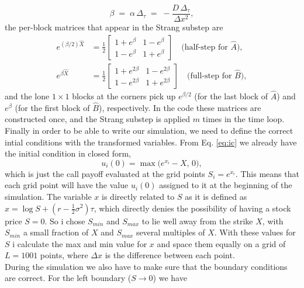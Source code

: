 \documentclass[11pt]{article}
\begin{document}
\begin{equation}
    \beta \;=\; \alpha\,\Delta_\tau \;=\; -\frac{D\,\Delta_\tau}{\Delta x^{2}},
    \label{eq:beta}
\end{equation}
the per-block matrices that appear in the Strang substep are
\begin{align}
    e^{(\beta/2)\hat{X}} &= \frac{1}{2}\begin{bmatrix}
         1 + e^{\beta} & 1-e^{\beta} \\
        1-e^{\beta} & 1 + e^{\beta}
    \end{bmatrix}\quad \text{(half-step for $\hat A$)},\\
    e^{\beta\hat{X}}   &= \frac{1}{2}\begin{bmatrix}
         1 + e^{2\beta} & 1-e^{2\beta} \\
        1-e^{2\beta} & 1 + e^{2\beta}
    \end{bmatrix}\quad \text{(full-step for $\hat B$)},
\end{align}
and the lone $1\times 1$ blocks at the corners pick up $e^{\beta/2}$ (for the last block of $\hat A$) and $e^{\beta}$ (for the first block of $\hat B$), respectively. In the code these matrices are constructed once, and the Strang substep is applied $m$ times in the time loop.\\
Finally in order to be able to write our simulation, we need to define the correct intial conditions with the transformed variables. From Eq. \ref{eq:ic} we already have the initial condition in closed form,
\begin{equation}
    u_i (0) = \max\!\bigl(e^{x_i} - X,\,0\bigr),
    \label{eq:boundary1}
\end{equation}
which is just the call payoff evaluated at the grid points $S_i = e^{x_i}$. This means that each grid point will have the value $u_i(0)$ assigned to it at the beginning of the simulation. The variable $x$ is directly related to $S$ as it is defined as $x = \log{S} + (r - \frac{1}{2}\sigma^2)\tau$, which directly denies the possibility of having a stock price $S=0$. So i chose $S_{min}$ and $S_{max}$ to lie well away from the strike $X$, with $S_{min}$ a small fraction of $X$ and $S_{max}$ several multiples of $X$. With these values for $S$ i calculate the max and min value for $x$ and space them equally on a grid of $L=1001$ points, where $\Delta x$ is the difference between each point.\\
During the simulation we also have to make sure that the boundary conditions are correct. For the left boundary ($S\rightarrow 0$) we have
\end{document}
